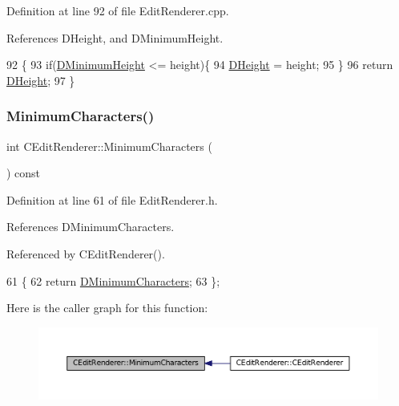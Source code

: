 Definition at line 92 of file Edit\+Renderer.\+cpp.



References D\+Height, and D\+Minimum\+Height.


\begin{DoxyCode}
92                                    \{
93     \textcolor{keywordflow}{if}(\hyperlink{classCEditRenderer_a9e063123747e147ef1c35bd962205fbd}{DMinimumHeight} <= height)\{
94         \hyperlink{classCEditRenderer_ade8dedb4f9790d28b38da8ef20a171cb}{DHeight} = height;   
95     \}
96     \textcolor{keywordflow}{return} \hyperlink{classCEditRenderer_ade8dedb4f9790d28b38da8ef20a171cb}{DHeight};
97 \}
\end{DoxyCode}
\hypertarget{classCEditRenderer_a36726cc31fedec0820076c03186158e7}{}\label{classCEditRenderer_a36726cc31fedec0820076c03186158e7} 
\subsubsection{\texorpdfstring{Minimum\+Characters()}{MinimumCharacters()}\hspace{0.1cm}{\footnotesize\ttfamily [1/2]}}
{\footnotesize\ttfamily int C\+Edit\+Renderer\+::\+Minimum\+Characters (\begin{DoxyParamCaption}{ }\end{DoxyParamCaption}) const\hspace{0.3cm}{\ttfamily [inline]}}



Definition at line 61 of file Edit\+Renderer.\+h.



References D\+Minimum\+Characters.



Referenced by C\+Edit\+Renderer().


\begin{DoxyCode}
61                                      \{
62             \textcolor{keywordflow}{return} \hyperlink{classCEditRenderer_ae5d0bd249b2d483c361b0bf9c16c15d3}{DMinimumCharacters};  
63         \};
\end{DoxyCode}
Here is the caller graph for this function\+:\nopagebreak
\begin{figure}[H]
\begin{center}
\leavevmode
\includegraphics[width=350pt]{classCEditRenderer_a36726cc31fedec0820076c03186158e7_icgraph}
\end{center}
\end{figure}
\hypertarget{classCEditRenderer_a0ed256b9ca7726b2f7de88b4682ed595}{}\label{classCEditRenderer_a0ed256b9ca7726b2f7de88b4682ed595} 

